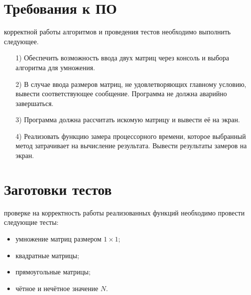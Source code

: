 \section{Требования к ПО}
 корректной работы алгоритмов и проведения тестов необходимо выполнить следующее.
\begin{enumerate}
	\item[1)]Обеспечить возможность ввода двух матриц через консоль и выбора алгоритма для умножения.
	\item[2)]В случае ввода размеров матриц, не удовлетворяющих главному условию, вывести соответствующее сообщение. Программа не должна аварийно завершаться.
	\item[3)]Программа должна рассчитать искомую матрицу и вывести её на экран.
	\item[4)]Реализовать функцию замера процессорного времени, которое выбранный метод затрачивает на вычисление результата. Вывести результаты замеров на экран.
\end{enumerate}


\section{Заготовки тестов}
 проверке на корректность работы реализованных функций необходимо провести следующие тесты:
\begin{itemize}
	\item умножение матриц размером $1 \times 1$;
	\item квадратные матрицы;
	\item прямоугольные матрицы;
	\item чётное и нечётное значение $N$.
\end{itemize}